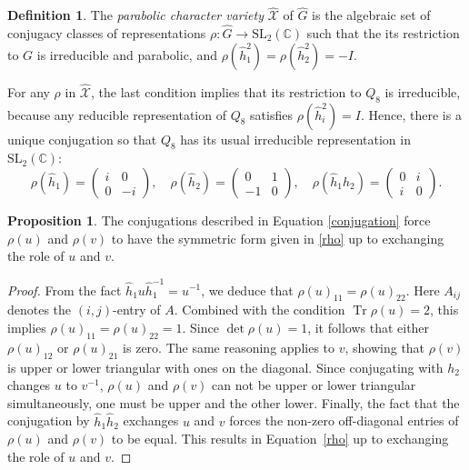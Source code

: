 \documentclass{amsart}
\newcommand{\C}{\mathbb{C}}
\newcommand{\SL}{\mathrm{SL}}
\newcommand{\calX}{\mathcal{X}}
\DeclareMathOperator{\Tr}{Tr}
\theoremstyle{definition}
\newtheorem{Definition}[Theorem]{Definition}
\newtheorem{Proposition}[Theorem]{Proposition}
\begin{document}
\begin{Definition}
The \emph{parabolic character variety} $\hat{\calX}$ of $\hat{G}$ is the algebraic set of conjugacy classes of representations $\rho:\hat{G}\to \SL_2(\C)$ such that the its restriction  to $G$ is irreducible and parabolic, and $\rho(\hat{h}_1^2)=\rho(\hat{h}_2^2)=-I$.
\end{Definition}

For any $\rho$ in $\hat{\calX}$, the last condition implies that its restriction to $Q_8$ is irreducible, because any reducible representation of $Q_8$ satisfies $\rho(\hat{h}_i^2)=I$. Hence, there is a unique conjugation so that $Q_8$ has its usual irreducible representation in $\SL_2(\C)$:
\begin{equation}
    \label{eqn.standard}
    \rho(\hat{h}_1)=\begin{pmatrix} i & 0 \\ 0 &-i\end{pmatrix},\quad \rho(\hat h_2)=\begin{pmatrix} 0 & 1 \\ -1 &0\end{pmatrix},\quad \rho(\hat h_1 \hat h_2)=\begin{pmatrix} 0 & i \\ i & 0 \end{pmatrix} . 
\end{equation}

\begin{Proposition}
The conjugations described in Equation \eqref{conjugation}  force $\rho(u)$ and $\rho(v)$ to have the symmetric form given in \eqref{rho} up to exchanging the role of $u$ and $v$.
\end{Proposition}
\begin{proof}
    From the fact $\hat{h}_1 u \hat{h}_1^{-1} = u^{-1}$, we deduce that $\rho(u)_{11}=\rho(u)_{22}$. Here $A_{ij}$ denotes the $(i,j)$-entry of $A$. Combined with the condition $\Tr \rho(u)=2$, this implies $\rho(u)_{11} = \rho(u)_{22} =1$. Since $\det \rho(u)=1$, it follows that either $\rho(u)_{12}$ or $\rho(u)_{21}$ is zero. The same reasoning applies to $v$, showing that $\rho(v)$ is upper or lower triangular with ones on the diagonal. 
    Since conjugating with $h_2$ changes $u$ to $v^{-1}$, $\rho(u)$ and $\rho(v)$ can not be upper or lower triangular simultaneously, one must be upper and the other lower. Finally, the fact that the conjugation by $\hat{h}_1 \hat{h}_2$ exchanges $u$ and $v$ forces the non-zero off-diagonal entries of $\rho(u)$ and $\rho(v)$ to be equal. This results in Equation~\eqref{rho} up to exchanging the role of $u$ and $v$.
\end{proof}
 
\end{document}
